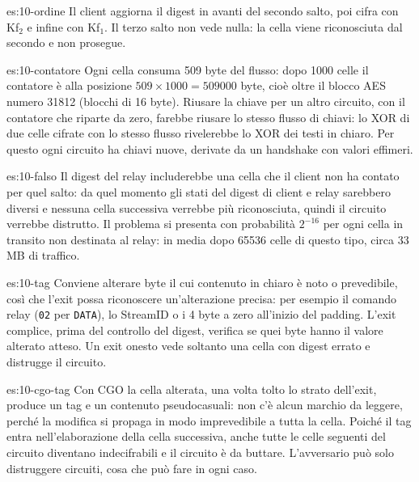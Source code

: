 \begin{soluzione}{es:10-ordine}
Il client aggiorna il digest in avanti del secondo salto, poi cifra con Kf$_2$ e infine con Kf$_1$. Il terzo salto non vede nulla: la cella viene riconosciuta dal secondo e non prosegue.
\end{soluzione}

\begin{soluzione}{es:10-contatore}
Ogni cella consuma 509 byte del flusso: dopo 1000 celle il contatore è alla posizione $509 \times 1000 = \num{509000}$ byte, cioè oltre il blocco AES numero \num{31812} (blocchi di 16 byte). Riusare la chiave per un altro circuito, con il contatore che riparte da zero, farebbe riusare lo stesso flusso di chiavi: lo XOR di due celle cifrate con lo stesso flusso rivelerebbe lo XOR dei testi in chiaro. Per questo ogni circuito ha chiavi nuove, derivate da un handshake con valori effimeri.
\end{soluzione}

\begin{soluzione}{es:10-falso}
Il digest del relay includerebbe una cella che il client non ha contato per quel salto: da quel momento gli stati del digest di client e relay sarebbero diversi e nessuna cella successiva verrebbe più riconosciuta, quindi il circuito verrebbe distrutto. Il problema si presenta con probabilità $2^{-16}$ per ogni cella in transito non destinata al relay: in media dopo \num{65536} celle di questo tipo, circa 33\,MB di traffico.
\end{soluzione}

\begin{soluzione}{es:10-tag}
Conviene alterare byte il cui contenuto in chiaro è noto o prevedibile, così che l'exit possa riconoscere un'alterazione precisa: per esempio il comando relay (\texttt{02} per \texttt{DATA}), lo StreamID o i 4 byte a zero all'inizio del padding. L'exit complice, prima del controllo del digest, verifica se quei byte hanno il valore alterato atteso. Un exit onesto vede soltanto una cella con digest errato e distrugge il circuito.
\end{soluzione}

\begin{soluzione}{es:10-cgo-tag}
Con CGO la cella alterata, una volta tolto lo strato dell'exit, produce un tag e un contenuto pseudocasuali: non c'è alcun marchio da leggere, perché la modifica si propaga in modo imprevedibile a tutta la cella. Poiché il tag entra nell'elaborazione della cella successiva, anche tutte le celle seguenti del circuito diventano indecifrabili e il circuito è da buttare. L'avversario può solo distruggere circuiti, cosa che può fare in ogni caso.
\end{soluzione}

